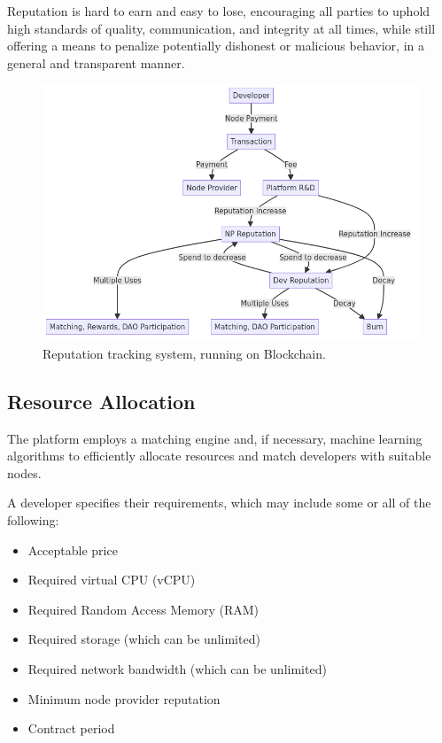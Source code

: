 Reputation is hard to earn and easy to lose, encouraging all parties to uphold high standards of quality, communication, and integrity at all times, while still offering a means to penalize potentially dishonest or malicious behavior, in a general and transparent manner.

\begin{figure}[ht]
    \centering
    \includegraphics[width=\columnwidth]{figures/impl-reputation.png}
    \caption{Reputation tracking system, running on Blockchain.}
    \label{fig:reputation-system}
\end{figure}


\subsection{Resource Allocation}
\label{sec:resource_allocation}

The platform employs a matching engine and, if necessary, machine learning algorithms to efficiently allocate resources and match developers with suitable nodes.

A developer specifies their requirements, which may include some or all of the following:
\begin{itemize}
    \item Acceptable price
    \item Required virtual CPU (vCPU)
    \item Required Random Access Memory (RAM)
    \item Required storage (which can be unlimited)
    \item Required network bandwidth (which can be unlimited)
    \item Minimum node provider reputation
    \item Contract period
\end{itemize}

